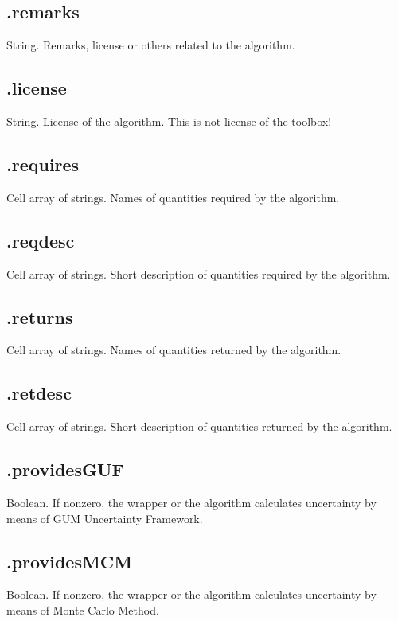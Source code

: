 \documentclass[12pt,a4paper,oneside]{report} %
\begin{document}
\subsection{\textsf{.remarks}} %
String. Remarks, license or others related to the algorithm.

\subsection{\textsf{.license}} %
String. License of the algorithm. This is not license of the toolbox!

\subsection{\textsf{.requires}} %
Cell array of strings. Names of quantities required by the algorithm.

\subsection{\textsf{.reqdesc}} %
Cell array of strings. Short description of quantities required by the algorithm.

\subsection{\textsf{.returns}} %
Cell array of strings. Names of quantities returned by the algorithm.

\subsection{\textsf{.retdesc}} %
Cell array of strings. Short description of quantities returned by the algorithm.

\subsection{\textsf{.providesGUF}} %
Boolean. If nonzero, the wrapper or the algorithm calculates uncertainty by means of GUM Uncertainty
Framework.

\subsection{\textsf{.providesMCM}} %
Boolean. If nonzero, the wrapper or the algorithm calculates uncertainty by means of Monte Carlo
Method.
\end{document}

